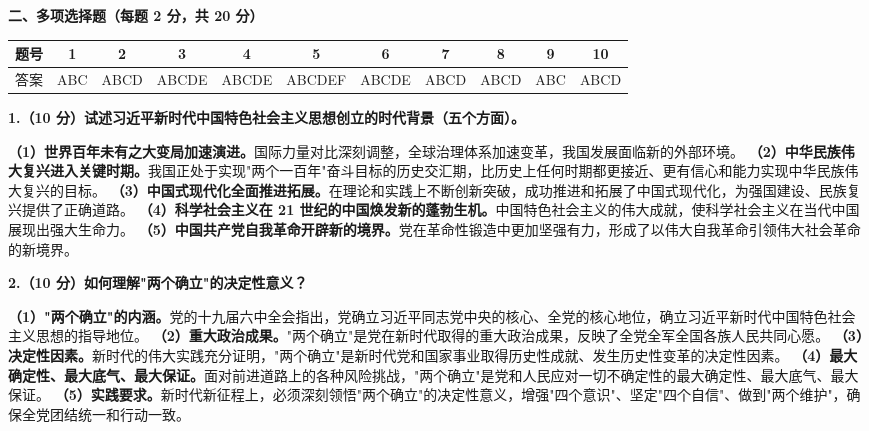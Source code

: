 \documentclass[12pt, a4paper]{article}
\newcounter{bigq}
\newcommand{\BigQ}[1]{%
  \stepcounter{bigq}%
  \vspace{6pt}%
  \noindent{\large\bfseries 第\chinese{bigq}大题\quad #1}%
  \vspace{4pt}\par
}
\begin{document}
\noindent\textbf{二、多项选择题（每题 2 分，共 20 分）}
\vspace{4pt}
\begin{center}
\small
\setlength{\tabcolsep}{4pt}
\begin{tabular}{|c|c|c|c|c|c|c|c|c|c|c|}
\hline
题号 & 1 & 2 & 3 & 4 & 5 & 6 & 7 & 8 & 9 & 10 \\
\hline
答案 & ABC & ABCD & ABCDE & ABCDE & ABCDEF & ABCDE & ABCD & ABCD & ABC & ABCD \\
\hline
\end{tabular}
\end{center}
\vspace{10pt}
\BigQ{简答题参考答案}
\vspace{4pt}

\noindent\textbf{1.（10 分）试述习近平新时代中国特色社会主义思想创立的时代背景（五个方面）。}
\begin{answerbox}
\textbf{（1）世界百年未有之大变局加速演进。}国际力量对比深刻调整，全球治理体系加速变革，我国发展面临新的外部环境。
\textbf{（2）中华民族伟大复兴进入关键时期。}我国正处于实现"两个一百年"奋斗目标的历史交汇期，比历史上任何时期都更接近、更有信心和能力实现中华民族伟大复兴的目标。
\textbf{（3）中国式现代化全面推进拓展。}在理论和实践上不断创新突破，成功推进和拓展了中国式现代化，为强国建设、民族复兴提供了正确道路。
\textbf{（4）科学社会主义在 21 世纪的中国焕发新的蓬勃生机。}中国特色社会主义的伟大成就，使科学社会主义在当代中国展现出强大生命力。
\textbf{（5）中国共产党自我革命开辟新的境界。}党在革命性锻造中更加坚强有力，形成了以伟大自我革命引领伟大社会革命的新境界。
\end{answerbox}
\vspace{6pt}

\noindent\textbf{2.（10 分）如何理解"两个确立"的决定性意义？}
\begin{answerbox}
\textbf{（1）"两个确立"的内涵。}党的十九届六中全会指出，党确立习近平同志党中央的核心、全党的核心地位，确立习近平新时代中国特色社会主义思想的指导地位。
\textbf{（2）重大政治成果。}"两个确立"是党在新时代取得的重大政治成果，反映了全党全军全国各族人民共同心愿。
\textbf{（3）决定性因素。}新时代的伟大实践充分证明，"两个确立"是新时代党和国家事业取得历史性成就、发生历史性变革的决定性因素。
\textbf{（4）最大确定性、最大底气、最大保证。}面对前进道路上的各种风险挑战，"两个确立"是党和人民应对一切不确定性的最大确定性、最大底气、最大保证。
\textbf{（5）实践要求。}新时代新征程上，必须深刻领悟"两个确立"的决定性意义，增强"四个意识"、坚定"四个自信"、做到"两个维护"，确保全党团结统一和行动一致。
\end{answerbox}
\vspace{6pt}
\end{document}
